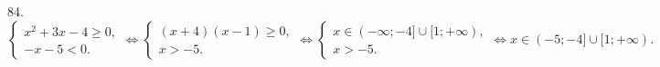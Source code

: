 84. $\begin{cases} x^2+3x-4\geqslant0,\\ -x-5<0.\end{cases}\Leftrightarrow \begin{cases} (x+4)(x-1)\geqslant0,\\ x>-5.\end{cases}
\Leftrightarrow \begin{cases} x\in(-\infty;-4]\cup[1;+\infty),\\ x>-5.\end{cases}\Leftrightarrow x\in(-5;-4]\cup[1;+\infty).$\\
